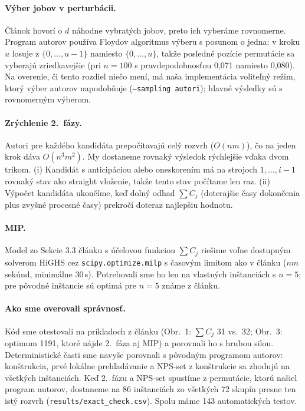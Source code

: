 \documentclass[11pt,a4paper]{article}
\newcommand{\Csum}{\sum C_j}
\begin{document}
\paragraph{Výber jobov v perturbácii.} Článok hovorí o $d$ náhodne vybratých jobov, preto ich
vyberáme rovnomerne. Program autorov používa Floydov algoritmus výberu s posunom o jedna: v kroku
$u$ losuje z $\{0,\dots,u-1\}$ namiesto $\{0,\dots,u\}$, takže posledné pozície permutácie sa
vyberajú zriedkavejšie (pri $n=100$ s pravdepodobnosťou 0,071 namiesto 0,080). Na overenie, či
tento rozdiel niečo mení, má naša implementácia voliteľný režim, ktorý výber autorov napodobňuje
(\texttt{--sampling autori}); hlavné výsledky sú s rovnomerným výberom.

\paragraph{Zrýchlenie 2.~fázy.} Autori pre každého kandidáta prepočítavajú celý rozvrh
($O(nm)$), čo na jeden krok dáva $O(n^3m^2)$. My dostaneme rovnaký výsledok rýchlejšie vďaka
dvom trikom. (i) Kandidát s anticipáciou alebo oneskorením má na strojoch $1,\dots,i-1$ rovnaký
stav ako straight vloženie, takže tento stav počítame len raz. (ii) Výpočet kandidáta
ukončíme, keď dolný odhad $\Csum$ (doterajšie časy dokončenia plus zvyšné procesné časy)
prekročí doteraz najlepšiu hodnotu.

\paragraph{MIP.} Model zo Sekcie 3.3 článku s účelovou funkciou $\Csum$ riešime voľne dostupným
solverom HiGHS \cite{HuangfuHall2018} cez \texttt{scipy.optimize.milp} s časovým limitom ako v článku ($nm$ sekúnd,
minimálne 30\,s). Potrebovali sme ho len na vlastných inštanciách s $n=5$; pre pôvodné inštancie
sú optimá pre $n=5$ známe z článku.

\paragraph{Ako sme overovali správnosť.} Kód sme otestovali na príkladoch z článku (Obr.~1:
$\Csum$ 31 vs.\ 32; Obr.~3: optimum 1191, ktoré nájde 2.~fáza aj MIP) a porovnali ho s hrubou
silou. Deterministické časti sme navyše porovnali s pôvodným programom autorov: konštrukcia,
prvé lokálne prehľadávanie a NPS-set z konštrukcie sa zhodujú na všetkých inštanciách. Keď
2.~fázu a NPS-set spustíme z permutácie, ktorú našiel program autorov, dostaneme na 86
inštanciách zo všetkých 72 skupín presne ten istý rozvrh (\texttt{results/exact\_check.csv}).
Spolu máme 143 automatických testov.
\end{document}
